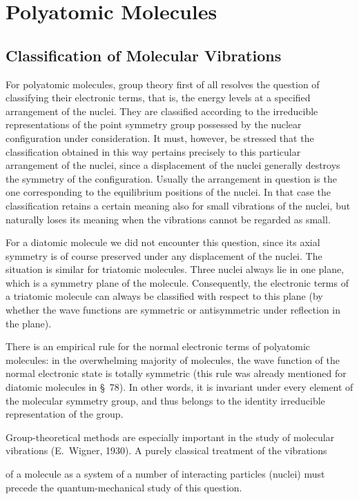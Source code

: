 \chapter{Polyatomic Molecules}
\setcounter{section}{99}
\setcounter{figure}{40}
\section{Classification of Molecular Vibrations}

For polyatomic molecules, group theory first of all resolves the question of classifying their electronic terms, that is, the energy levels at a specified arrangement of the nuclei. They are classified according to the irreducible representations of the point symmetry group possessed by the nuclear configuration under consideration. It must, however, be stressed that the classification obtained in this way pertains precisely to this particular arrangement of the nuclei, since a displacement of the nuclei generally destroys the symmetry of the configuration. Usually the arrangement in question is the one corresponding to the equilibrium positions of the nuclei. In that case the classification retains a certain meaning also for small vibrations of the nuclei, but naturally loses its meaning when the vibrations cannot be regarded as small.

For a diatomic molecule we did not encounter this question, since its axial symmetry is of course preserved under any displacement of the nuclei. The situation is similar for triatomic molecules. Three nuclei always lie in one plane, which is a symmetry plane of the molecule. Consequently, the electronic terms of a triatomic molecule can always be classified with respect to this plane (by whether the wave functions are symmetric or antisymmetric under reflection in the plane).

There is an empirical rule for the normal electronic terms of polyatomic molecules: in the overwhelming majority of molecules, the wave function of the normal electronic state is totally symmetric (this rule was already mentioned for diatomic molecules in \S~78). In other words, it is invariant under every element of the molecular symmetry group, and thus belongs to the identity irreducible representation of the group.

Group-theoretical methods are especially important in the study of molecular vibrations (E.~Wigner, 1930). A purely classical treatment of the vibrations

of a molecule as a system of a number of interacting particles (nuclei) must precede the quantum-mechanical study of this question.

